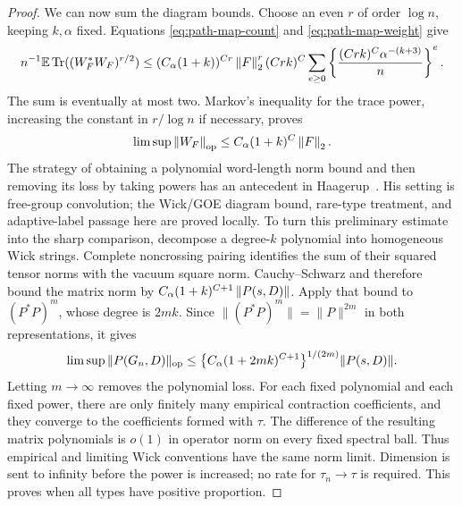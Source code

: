 \begin{proof}
We can now sum the diagram bounds.  Choose an even $r$ of order
$\log n$, keeping $k,\alpha$ fixed.  Equations
\eqref{eq:path-map-count} and \eqref{eq:path-map-weight} give
\[
 n^{-1}\mathbb E\operatorname{Tr}((W_F^*W_F)^{r/2})
 \le (C_\alpha(1+k))^{Cr}\left\lVert F\right\rVert_2^r
       (Crk)^C\sum_{e\ge0}
       \left\{\frac{(Crk)^C\alpha^{-(k+3)}}n\right\}^{e}.
\]
The sum is eventually at most two.  Markov's inequality for the trace
power, increasing the constant in $r/\log n$ if necessary, proves
\begin{equation}
 \limsup\left\lVert W_F\right\rVert_{\mathrm{op}}
       \le C_\alpha(1+k)^C\left\lVert F\right\rVert_2.
 \label{eq:path-wick-preliminary}
\end{equation}
The strategy of obtaining a polynomial word-length norm bound and then
removing its loss by taking powers has an antecedent in
Haagerup~\cite[Lemmas~1.3--1.4, pp.~283--286]{Haagerup1979}.
His setting is free-group convolution; the Wick/GOE diagram bound,
rare-type treatment, and adaptive-label passage here are proved locally.
To turn this preliminary estimate into the sharp comparison, decompose
a degree-$k$ polynomial into homogeneous Wick strings.  Complete
noncrossing pairing identifies the sum of their squared tensor norms
with the vacuum square norm.  Cauchy--Schwarz and
 therefore bound the matrix norm by
$C_\alpha(1+k)^{C+1}\left\lVert P(s,D)\right\rVert$.
Apply that bound to $(P^*P)^m$, whose degree is $2mk$.  Since
$\|(P^*P)^m\|=\|P\|^{2m}$ in both representations, it gives
\[
 \limsup\|P(G_n,D)\|_{\mathrm{op}}
 \le \bigl\{C_\alpha(1+2mk)^{C+1}\bigr\}^{1/(2m)}
                  \|P(s,D)\|.
\]
Letting $m\to\infty$ removes the polynomial loss.
For each fixed polynomial and each fixed power,
there are only finitely many empirical contraction coefficients, and
they converge to the coefficients formed with $\tau$.  The difference
of the resulting matrix polynomials is $o(1)$ in operator norm on
every fixed spectral ball.  Thus empirical and limiting Wick
conventions have the same norm limit.  Dimension is sent to infinity
before the power is increased; no rate for $\tau_n\to\tau$ is required.
This proves  when all types have positive
proportion.


\end{proof}
